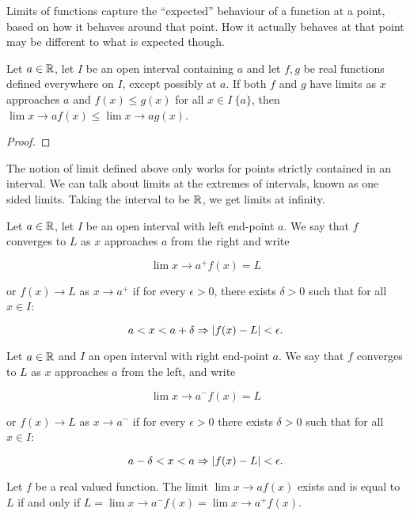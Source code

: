 Limits of functions capture the ``expected'' behaviour of a function at a point, based on how it behaves around that point. How it actually behaves at that point may be different to what is expected though.

\begin{theorem}
Let \(a \in \mathbb{R}\), let \(I\) be an open interval containing \(a\) and let \(f,g\) be real functions defined everywhere on \(I\), except possibly at \(a\). If both \(f\) and \(g\) have limits as \(x\) approaches \(a\) and \(f(x) \leq g(x)\) for all \(x \in I \ \{a\}\), then \(\lim{x \to a}{f(x)} \leq \lim{x \to a}{g(x)}\).
\end{theorem}

\begin{proof}
\end{proof}

The notion of limit defined above only works for points strictly contained in an interval. We can talk about limits at the extremes of intervals, known as one sided limits. Taking the interval to be \(\mathbb{R}\), we get  limits at infinity.

\begin{definition}
  Let \(a \in \mathbb{R}\), let \(I\) be an open interval with left end-point \(a\). We say that \(f\) converges to \(L\) as \(x\) approaches \(a\) from the right and write

  \[\lim{x \to a^{+}}{f(x)} = L\]

  or \(f(x) \to L\) as \(x \to a^{+}\) if for every \(\epsilon > 0\), there exists \(\delta > 0\) such that for all \(x \in I\):

  \[a < x < a + \delta \Rightarrow \abs{f(x) - L} < \epsilon.\]

  Let \(a \in \mathbb{R}\) and \(I\) an open interval with right end-point \(a\). We say that \(f\) converges to \(L\) as \(x\) approaches \(a\) from the left, and write

  \[\lim{x \to a^{-}}{f(x)} = L\]

  or \(f(x) \to L\) as \(x \to a^{-}\) if for every \(\epsilon > 0\) there exists \(\delta > 0\) such that for all \(x \in I\):

  \[a - \delta < x < a \Rightarrow \abs{f(x) - L} < \epsilon.\]
\end{definition}

\begin{theorem}
  Let \(f\) be a real valued function. The limit \(\lim{x \to a}{f(x)}\) exists and is equal to \(L\) if and only if \(L = \lim{x \to a^{-}}{f(x)} = \lim{x \to a^{+}}{f(x)}\).
\end{theorem}

